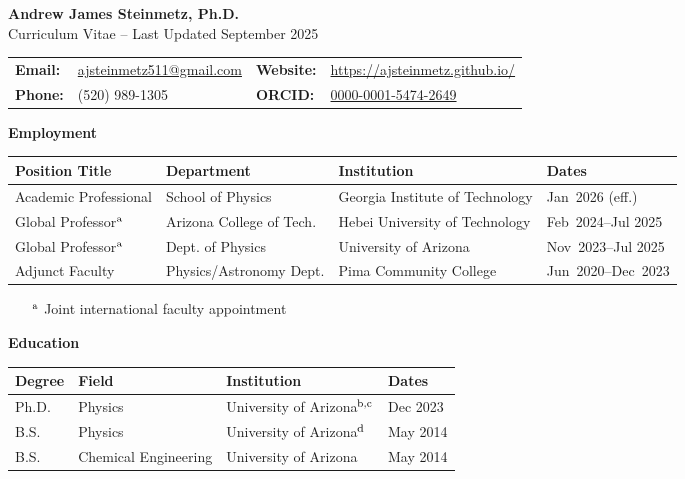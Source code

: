 \documentclass[11pt]{article}
\begin{document}
\begin{center}
    {\Large\textbf{Andrew James Steinmetz, Ph.D.}}\\[0.5em]
    {\large Curriculum Vitae -- Last Updated September 2025}
\end{center}

{\normalsize
\begin{center}
    \begin{tabular}{@{}p{2.0cm} p{5.0cm} p{2.0cm} p{5.0cm}@{}}
        \textbf{Email:} & \href{mailto:ajsteinmetz511@gmail.com}{ajsteinmetz511@gmail.com} &
        \textbf{Website:} & \href{https://ajsteinmetz.github.io/}{https://ajsteinmetz.github.io/} \\
        \textbf{Phone:} & (520) 989-1305 &
        \textbf{ORCID:} & \href{https://orcid.org/0000-0001-5474-2649}{0000-0001-5474-2649} \\
    \end{tabular}
\end{center}
}

\medskip

{\Large\textbf{Employment}}

{\normalsize
\begin{tabular}{@{}p{3.8cm} p{4.4cm} p{5.3cm} p{3.0cm}@{}}
    \toprule
    \textbf{Position Title} & \textbf{Department} & \textbf{Institution} & \textbf{Dates} \\
    \midrule
    Academic Professional & School of Physics & Georgia Institute of Technology & {\small Jan~2026 (eff.)} \\ 
    Global Professor\(^{\rm a}\) & Arizona College of Tech. & Hebei University of Technology & {\small Feb~2024--Jul 2025} \\
    Global Professor\(^{\rm a}\) & Dept. of Physics & University of Arizona              & {\small Nov~2023--Jul 2025} \\
    Adjunct Faculty  & Physics/Astronomy Dept. & Pima Community College       & {\small Jun~2020--Dec~2023} \\
    \bottomrule
\end{tabular}
}

\begin{itemize}[leftmargin=*,nosep]
    \item[\(^{\rm a}\)] {\small Joint international faculty appointment}
\end{itemize}

\medskip

{\Large\textbf{Education}}

{\normalsize
\begin{tabular}{@{}p{2.8cm} p{5.0cm} p{5.5cm} p{3.2cm}@{}}
    \toprule
    \textbf{Degree} & \textbf{Field} & \textbf{Institution} & \textbf{Dates} \\
    \midrule
    Ph.D. & Physics             & University of Arizona\(^{\rm b,c}\) & Dec 2023 \\
    B.S.   & Physics             & University of Arizona\(^{\rm d}\) & May 2014 \\
    B.S.   & Chemical Engineering& University of Arizona & May 2014 \\
    \bottomrule
\end{tabular}
}
\end{document}
